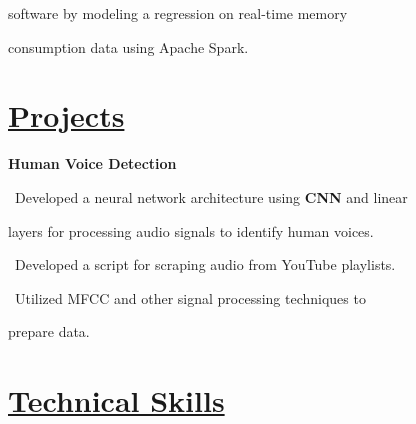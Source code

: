 \documentclass{article}
\begin{document}
\begin{minipage}[t][0pt]{8in\linewidth}
\begin{minipage}[t]{0.45\textwidth\hspace{0in}}
\begin{minipage}[t]{3.75in\textwidth\hspace{0in}}
            \hspace{1.6em} software by modeling a regression on real-time memory 
            
            \hspace{1.6em} consumption data using Apache Spark.
        \end{minipage}

        \vspace{-0.3em}
        \section{\underline{Projects}}
        \begin{minipage}[t]{3.75in\textwidth\hspace{0in}}
            \mdseries\bfseries{Human Voice Detection}            
            
            \vspace{0.6em}
            \small\mdseries
            \hspace{1em}\textasteriskcentered \, \mdseries\textrm{Developed a neural network architecture using \textbf{CNN} and linear} 
            
            \hspace{2em}layers for processing audio signals to identify human voices.

            \vspace{0.6em}
            \hspace{1em}\textasteriskcentered \, \mdseries\textrm{Developed a script for scraping audio from YouTube playlists.}
            
            \vspace{0.6em}
            \hspace{1em}\textasteriskcentered \, \mdseries\textrm{Utilized MFCC and other signal processing techniques to} 
            
            \hspace{1.7em} prepare data.

        \end{minipage}

\end{minipage}
    \begin{minipage}[t]{3.1in\linewidth\hspace{2.8em}}
    \section{\underline{Technical Skills}}
    \vspace{-0.7em}

\end{minipage}
\end{minipage}
\end{document}
